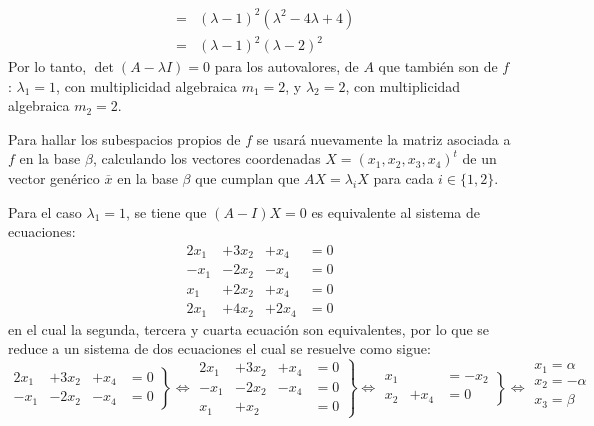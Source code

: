 \begin{solucion}
\begin{eqnarray*}
  & = & (\lambda - 1)^2(\lambda^2 - 4\lambda + 4) \\ 
  & = & (\lambda - 1)^2(\lambda - 2)^2
 \end{eqnarray*}
 Por lo tanto, $\det (A - \lambda I) = 0$ para los autovalores, de $A$ que tambi\'en son de $f$: $\lambda_1 = 1$, con multiplicidad algebraica $m_1 = 2$, y $\lambda_2 = 2$, con multiplicidad algebraica $m_2 = 2$.
 \par 
 Para hallar los subespacios propios de $f$ se usar\'a nuevamente la matriz asociada a $f$ en la base $\beta$, calculando los vectores coordenadas $X = (x_1, x_2, x_3, x_4)^t$ de un vector gen\'erico $\overline{x}$ en la base $\beta$ que cumplan que $AX = \lambda_iX$ para cada $i \in \{ 1, 2 \}$. 
 \par 
 Para el caso $\lambda_1 = 1$, se tiene que $(A - I)X = 0$ es equivalente al sistema de ecuaciones:
 \begin{equation*}
  \begin{matrix}
   2x_1 & +3x_2 & + x_4 & = 0 \\
   -x_1 & -2x_2 & - x_4 & = 0 \\
    x_1 & +2x_2 & + x_4 & = 0 \\
   2x_1 & +4x_2 & +2x_4 & = 0
  \end{matrix}
 \end{equation*}
 en el cual la segunda, tercera y cuarta ecuaci\'on son equivalentes, por lo que se reduce a un sistema de dos ecuaciones el cual se resuelve como sigue:
 \begin{equation*}
  \left.
  \begin{matrix}
   2x_1 & +3x_2 & + x_4 & = 0 \\
   -x_1 & -2x_2 & - x_4 & = 0
  \end{matrix}
  \right\}
  \Leftrightarrow 
  \left. 
  \begin{matrix}
   2x_1 & +3x_2 & + x_4 & = 0 \\
   -x_1 & -2x_2 & - x_4 & = 0 \\
   x_1  & + x_2 &       & = 0
  \end{matrix}
  \right\}
  \Leftrightarrow 
  \left. 
  \begin{matrix}
   x_1 &       & = - x_2 \\
   x_2 & + x_4 & = 0 
  \end{matrix}
  \right\}
  \Leftrightarrow
  \left. 
  \begin{matrix}
   x_1 = \alpha \\
   x_2 = -\alpha \\
   x_3 = \beta \\

\end{matrix}
\end{equation*}
\end{solucion}
